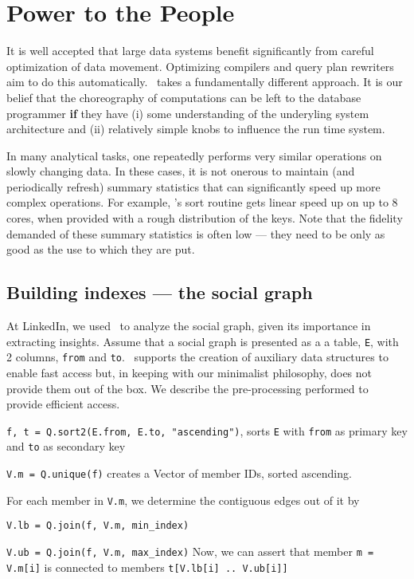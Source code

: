 \section{Power to the People}

It is well accepted that large data systems benefit significantly 
from careful optimization of data movement. Optimizing compilers and query plan
rewriters aim to do this automatically.
\Q\ takes a fundamentally different approach. It is our belief that the
choreography of computations can be left to the database programmer {\bf if} 
they have 
(i) some understanding of the underyling system architecture and (ii) 
relatively simple knobs to influence the run time system.  

In many analytical tasks, one repeatedly performs very similar operations on slowly
changing data. In these cases, 
it is not onerous to maintain (and periodically refresh) summary statistics that
can significantly speed up more complex operations. For example, \Q's sort
routine gets linear speed up on up to 8 cores, when provided with
a rough distribution of the keys. 
Note that the fidelity demanded of these summary statistics is often low ---
they need to be only as good as the use to which they are put. 

\subsection{Building indexes --- the social graph}
\label{social_graph}

At LinkedIn, we used \Q\ to analyze the social graph, given its importance in
extracting insights.
Assume that a social graph is presented as a 
a table, {\tt E}, with 2 columns, {\tt from} and {\tt to}. \Q\ supports the
creation of auxiliary data structures to enable fast access but, in keeping with
our minimalist philosophy, does not provide them out of the box. We describe the
pre-processing performed to provide efficient access.
\be
\item {\tt f, t = Q.sort2(E.from, E.to, "ascending")}, sorts {\tt E}
with {\tt from} as primary key and {\tt to} as
secondary key
\item {\tt V.m = Q.unique(f)} creates a Vector of 
member IDs, sorted ascending. 
\item For each member in {\tt V.m}, we determine the contiguous edges out of it
  by 
  \be
\item {\tt V.lb = Q.join(f, V.m, min\_index)}
\item {\tt V.ub = Q.join(f, V.m, max\_index)}
  \ee
Now, we can assert that member
{\tt m = V.m[i]} is connected to members {\tt t[V.lb[i] .. V.ub[i]]}
\ee

